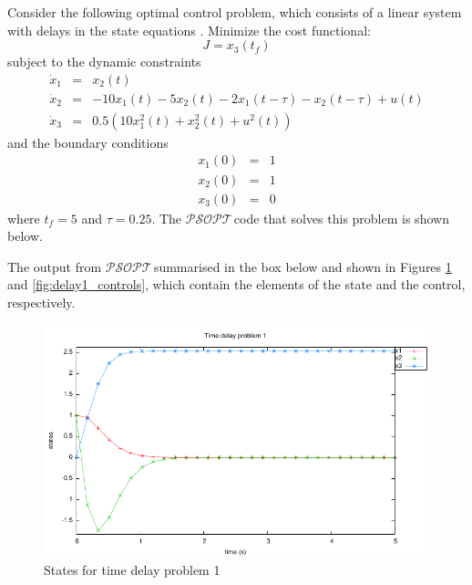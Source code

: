 \documentclass[a4paper,11pt]{report}    %
\newcommand{\psopt}{$\mathcal{PSOPT}$\,}  %
\newenvironment{shadedframe}{%
  \def\FrameCommand{\fcolorbox{black}{shadecolor}}%
  \MakeFramed {\FrameRestore}}
{\endMakeFramed}
\begin{document}
Consider the following optimal control problem, which consists of a linear system
with delays in the state equations \cite{Luus:02}.  Minimize the cost functional:
\begin{equation}
  J = x_3(t_f)
\end{equation}
subject to the dynamic constraints
\begin{equation}
  \begin{array}{lcl}
    \dot x_1 & = & x_2(t) \\
    \dot x_2 & = & -10 x_1(t)-5 x_2(t)-2 x_1(t-\tau)-x_2(t-\tau)+u(t)\\
    \dot x_3 & = & 0.5 (10 x_1^2(t)+x_2^2(t)+u^2(t))
  \end{array}
\end{equation}
and the boundary conditions
\begin{equation}
  \begin{array}{lcl}
    x_1(0) & = & 1 \\
    x_2(0) & = & 1 \\
    x_3(0) & = & 0 
  \end{array}
\end{equation}
where $t_f=5$ and $\tau = 0.25$. The
\psopt code that solves this problem is shown below.  

\tiny
\begin{shadedframe}

\end{shadedframe}
\normalsize

The output from \psopt summarised in the box below and shown in Figures \ref{fig:delay1_states} and \ref{fig:delay1_controls}, which contain the elements
of the state and the control, respectively. 	 
\begin{shadedframe}

\end{shadedframe}

\begin{figure}
  \centering 
  \includegraphics{../examples/delay1/delay1_states}
  \caption{States for time delay problem 1}
 \label{fig:delay1_states}
\end{figure}
\end{document}
